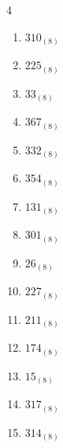 \begin{multicols}{4}
\begin{enumerate}
        \phantom{$=39$}

  \item $310_{(8)}$

        \phantom{$=200$}

  \item $225_{(8)}$

        \phantom{$=149$}

  \item $33_{(8)}$

        \phantom{$=27$}

  \item $367_{(8)}$

        \phantom{$=247$}

  \item $332_{(8)}$

        \phantom{$=218$}

  \item $354_{(8)}$

        \phantom{$=236$}

  \item $131_{(8)}$

        \phantom{$=89$}

  \item $301_{(8)}$

        \phantom{$=193$}

  \item $26_{(8)}$

        \phantom{$=22$}

  \item $227_{(8)}$

        \phantom{$=151$}

  \item $211_{(8)}$

        \phantom{$=137$}

  \item $174_{(8)}$

        \phantom{$=124$}

\columnbreak %

  \item $15_{(8)}$

        \phantom{$=13$}

  \item $317_{(8)}$

        \phantom{$=207$}

  \item $314_{(8)}$

        \phantom{$=204$}


\end{enumerate}
\end{multicols}
